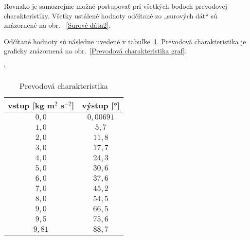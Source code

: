 \documentclass[a4paper, 10pt, ]{article}
\begin{document}
Rovnako je samozrejme možné postupovať pri všetkých bodoch prevodovej charakteristiky. Všetky ustálené hodnoty odčítané zo „surových dát“ sú znázornené na obr.~ \ref{Surové dáta2}.





Odčítané hodnoty sú následne uvedené v tabuľke~\ref{Prevodová charakteristika}. Prevodová charakteristika je graficky znázornená na obr.~\ref{Prevodová charakteristika graf}.






\begin{table}[b]
	\centering
	\catcode`

\caption{Prevodová charakteristika}
\label{Prevodová charakteristika}




\begin{tabular}{     c      c       }
\toprule
vstup [kg m$^2$ s$^{-2}$] & výstup [°] \\
\midrule
$0,0$ & $0,00691$\\
$1,0$ & $5,7$\\
$2,0$ & $11,8$\\
$3,0$ & $17,7$\\
$4,0$ & $24,3$\\
$5,0$ & $30,6$\\
$6,0$ & $37,6$\\
$7,0$ & $45,2$\\
$8,0$ & $54,5$\\
$9,0$ & $66,5$\\
$9,5$ & $75,6$\\
$9,81$ & $88,7$\\
\bottomrule
\end{tabular}
\end{table}












%
%
%
%
%
%
%
\end{document}
